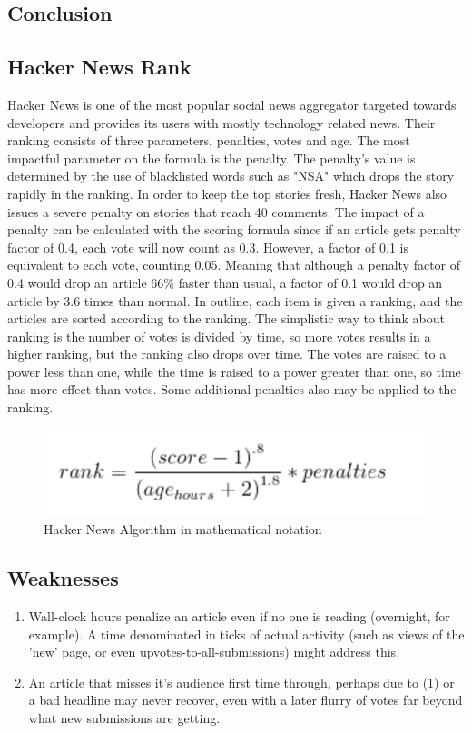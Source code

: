\subsection {Conclusion}

\subsection{Hacker News Rank}
Hacker News is one of the most popular social news aggregator targeted towards developers and provides its users with mostly technology related news. Their ranking consists of three parameters, penalties, votes and age. The most impactful parameter on the formula is the penalty. The penalty's value is determined by the use of blacklisted words such as "NSA" which drops the story rapidly in the ranking. In order to keep the top stories fresh, Hacker News also issues a severe penalty on stories that reach 40 comments. The impact of a penalty can be calculated with the scoring formula since if an article gets penalty factor of 0.4, each vote will now count as 0.3. However, a factor of 0.1 is equivalent to each vote, counting 0.05. Meaning that although a penalty factor of 0.4 would drop an article 66\% faster than usual, a factor of  0.1 would drop an article by 3.6 times than normal. In outline, each item is given a ranking, and the articles are sorted according to the ranking. The simplistic way to think about ranking is the number of votes is divided by time, so more votes results in a higher ranking, but the ranking also drops over time. The votes are raised to a power less than one, while the time is raised to a power greater than one, so time has more effect than votes. Some additional penalties also may be applied to the ranking.

\begin{figure} [h]
\begin{center}
	\includegraphics{Figures/hacker_news_rank}
\end{center}
	\caption{Hacker News Algorithm in mathematical notation}
\end{figure}

\subsection {Weaknesses}
\begin{enumerate}
  \item Wall-clock hours penalize an article even if no one is reading (overnight, for example). A time denominated in ticks of actual activity (such as views of the 'new' page, or even upvotes-to-all-submissions) might address this.
  \item An article that misses it's audience first time through, perhaps due to (1) or a bad headline may never recover, even with a later flurry of votes far beyond what new submissions are getting.
\end{enumerate}

